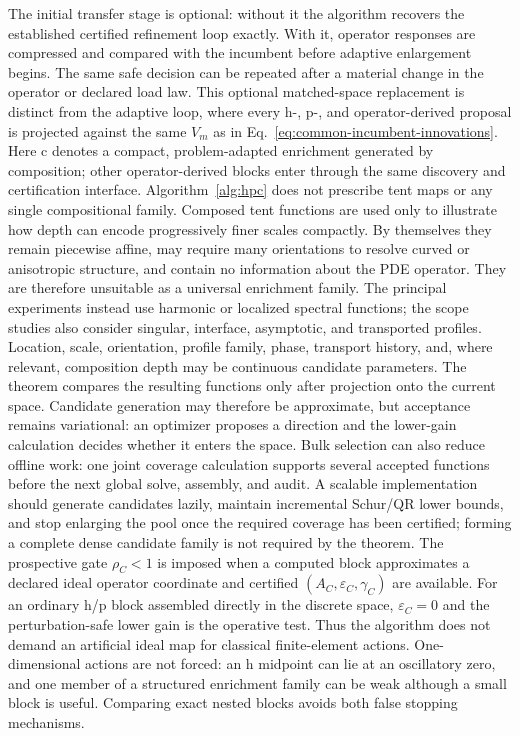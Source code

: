 \documentclass[11pt]{article}
\numberwithin{algorithm}{section}
\theoremstyle{definition}\newtheorem{definition}[theorem]{Definition}
\theoremstyle{remark}\newtheorem{remark}[theorem]{Remark}
\begin{document}
The initial transfer stage is optional: without it the algorithm recovers the
established certified refinement loop exactly.  With it, operator responses
are compressed and compared with the incumbent before adaptive enlargement
begins.  The same safe decision can be repeated after a material change in the
operator or declared load law.  This optional matched-space replacement is
distinct from the adaptive loop, where every h-, p-, and operator-derived
proposal is projected against the same $V_m$ as in
Eq.~\eqref{eq:common-incumbent-innovations}.  Here c denotes a compact, problem-adapted
enrichment generated by composition; other operator-derived blocks enter
through the same discovery and certification interface.
Algorithm~\ref{alg:hpc} does not prescribe tent maps or any single
compositional family.  Composed tent functions are used only to illustrate how
depth can encode progressively finer scales compactly.  By themselves they
remain piecewise affine, may require many orientations to resolve curved or
anisotropic structure, and contain no information about the PDE operator.
They are therefore unsuitable as a universal enrichment family.  The principal
experiments instead use harmonic or localized spectral functions; the scope
studies also consider singular, interface, asymptotic, and transported
profiles.  Location, scale, orientation, profile family, phase, transport
history, and, where relevant, composition depth may be continuous candidate
parameters.  The theorem compares the resulting
functions only after projection onto the current space.  Candidate generation
may therefore be approximate, but acceptance remains variational: an optimizer
proposes a direction and the lower-gain calculation decides whether it enters
the space.  Bulk selection can also reduce offline work: one joint coverage
calculation supports several accepted functions before the next global solve,
assembly, and audit.  A scalable implementation should generate candidates
lazily, maintain incremental Schur/QR lower bounds, and stop enlarging the
pool once the required coverage has been certified; forming a complete dense
candidate family is not required by the theorem.  The prospective gate $\rho_C<1$ is imposed when a computed block
approximates a declared ideal operator coordinate and certified
$(A_C,\varepsilon_C,\gamma_C)$ are available.  For an ordinary h/p block
assembled directly in the discrete space, $\varepsilon_C=0$ and the
perturbation-safe lower gain is the operative test.  Thus the algorithm does
not demand an artificial ideal map for classical finite-element actions.
One-dimensional actions are not forced: an h midpoint can lie at an
oscillatory zero, and one member of a structured enrichment family can be weak
although a small block is useful.  Comparing exact nested blocks avoids both
false stopping mechanisms.
\end{document}

